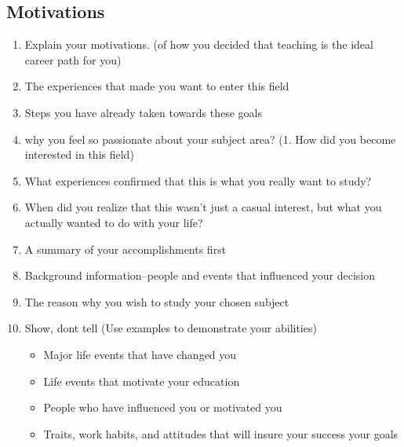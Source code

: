 \documentclass[a4paper,12pt]{article}%
\begin{document}
\subsection{Motivations}
\label{sec:Motivations}
\begin{enumerate}
	\item Explain your motivations.  (of how you decided that teaching is the ideal career path for you)
		\item The experiences that made you want to enter this field
		\item Steps you have already taken towards these goals   
		\item why you feel so passionate about your subject area?  (1.	How did you become interested in this field) 
			  \hrulefill
			  
	  \hrulefill
	  
		\item	What experiences confirmed that this is what you really want to study?
	\item	When did you realize that this wasn't just a casual interest, but what you actually wanted to do with your life?
			\item	A summary of your accomplishments first
				\item Background information--people and events that influenced your decision
 	\item 		The reason why you wish to study your chosen subject 
 	
 		  \hrulefill
 		  
	  \hrulefill
	  
 	\item Show, dont tell (Use examples to demonstrate your abilities)
\begin{itemize}
	\item Major life events that have changed you
	\item Life events that motivate your education
	\item People who have influenced you or motivated you 
	\item Traits, work habits, and attitudes that will insure your success your goals
\end{itemize}
 		  \hrulefill	
 		   
	  \hrulefill
	  

\end{enumerate}
\end{document}
